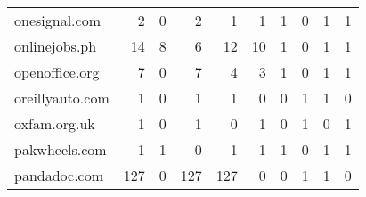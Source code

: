 \begin{tabular}{lrrrrrrrrr}
              onesignal.com &                                2 &                                  0 &                                      2 &                            1 &                           1 &                                   1 &                                      0 &                             1 &                            1 \\
              onlinejobs.ph &                               14 &                                  8 &                                      6 &                           12 &                          10 &                                   1 &                                      0 &                             1 &                            1 \\
             openoffice.org &                                7 &                                  0 &                                      7 &                            4 &                           3 &                                   1 &                                      0 &                             1 &                            1 \\
            oreillyauto.com &                                1 &                                  0 &                                      1 &                            1 &                           0 &                                   0 &                                      1 &                             1 &                            0 \\
               oxfam.org.uk &                                1 &                                  0 &                                      1 &                            0 &                           1 &                                   0 &                                      1 &                             0 &                            1 \\
              pakwheels.com &                                1 &                                  1 &                                      0 &                            1 &                           1 &                                   1 &                                      0 &                             1 &                            1 \\
               pandadoc.com &                              127 &                                  0 &                                    127 &                          127 &                           0 &                                   0 &                                      1 &                             1 &                            0 \\

\end{tabular}
